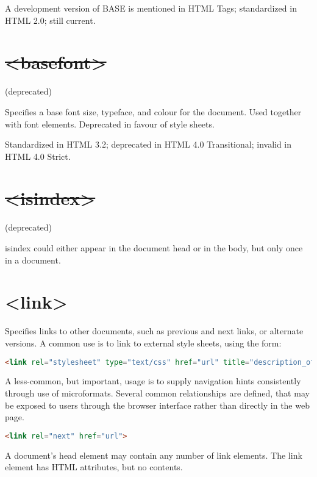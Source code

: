 A development version of BASE is mentioned in HTML Tags; standardized in HTML 2.0; still current.



\pdfstringdefDisableCommands{%
  \let\sout\relax
}

\section{\sout{<basefont>}}

(deprecated)

Specifies a base font size, typeface, and colour for the document. Used together with font elements. Deprecated in favour of style sheets.

Standardized in HTML 3.2; deprecated in HTML 4.0 Transitional; invalid in HTML 4.0 Strict.



\section{\sout{<isindex>}}

(deprecated)

isindex could either appear in the document head or in the body, but only once in a document. 


\section{<link>}

Specifies links to other documents, such as previous and next links, or alternate versions. A common use is to link to external style sheets, using the form:

\begin{lstlisting}[language=HTML]
<link rel="stylesheet" type="text/css" href="url" title="description_of_style">
\end{lstlisting}

A less-common, but important, usage is to supply navigation hints consistently through use of microformats. Several common relationships are defined, that may be exposed to users through the browser interface rather than directly in the web page.

\begin{lstlisting}[language=HTML]
<link rel="next" href="url">
\end{lstlisting}

A document's head element may contain any number of link elements. The link element has HTML attributes, but no contents.


